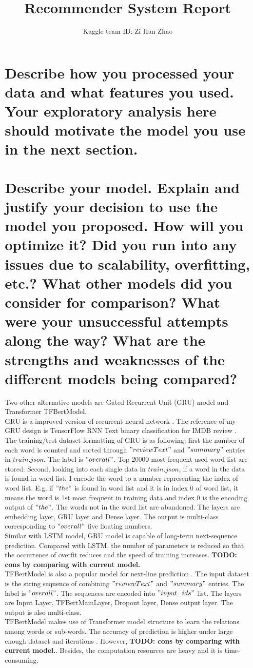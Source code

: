 \documentclass[12pt]{article}
\author{Kaggle team ID: Zi Han Zhao}
\affil{Student ID: zhaozih3}
\title{Recommender System Report}
\date{}
\begin{document}
\maketitle
\section{Describe how you processed your data and what features you used. Your exploratory analysis
here should motivate the model you use in the next section.}
\section{Describe your model. Explain and justify your decision to use the model you proposed. How
will you optimize it? Did you run into any issues due to scalability, overfitting, etc.? What
other models did you consider for comparison? What were your unsuccessful attempts along
the way? What are the strengths and weaknesses of the different models being compared?}
Two other alternative models are Gated Recurrent Unit (GRU) model and Transformer TFBertModel.\\
GRU is a improved version of recurrent neural network \cite{gru}. The reference of my GRU design is
TensorFlow RNN Text binary classification for IMDB review \cite{Textclassification}. The training/test dataset formatting of GRU is as following: first the number of each word is counted and sorted through $"reviewText"$ and $"summary"$ entries in $train.json$. The label is $"overall"$. Top 20000 most-frequent used word list are stored.
Second, looking into each single data in $train.json$, if a word in the data is found in word list, I
encode the word to a number representing the index of word list. E.g, if $"the"$ is found in word list
and it is in index 0 of word list, it means the word is 1st most frequent in training data and index 0
is the encoding output of $"the"$. The words not in the word list are abandoned. The layers are embedding
layer, GRU layer and Dense layer. The output is multi-class corresponding to $"overall"$ five floating
numbers.\\
Similar with LSTM model, GRU model is capable of long-term next-sequence prediction. Compared with LSTM, the number of parameters is reduced so that the occurrence of overfit reduces and the speed of training increases. \textbf{TODO: cons by comparing with current model.}\\
TFBertModel is also a popular model for next-line prediction \cite{BERT}. The input dataset is the string
sequence of combining $"reviewText"$ and $"summary"$ entries. The label is $"overall"$. The sequences are
encoded into $"input\_ids"$ list. The layers are Input Layer, TFBertMainLayer, Dropout layer, Dense output
layer. The output is also multi-class.\\
TFBertModel makes use of Transformer model structure to learn the relations among words or sub-words.
The accuracy of prediction is higher under large enough dataset and iterations \cite{BERTpros}. However, \textbf{TODO: cons by comparing with current model.}. Besides, the computation resources are heavy and it is
time-consuming.\\
\end{document}

